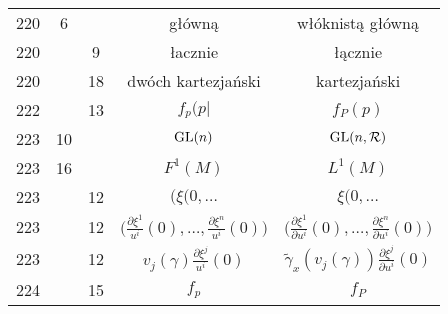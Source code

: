 \documentclass[a4paper,11pt]{article}
\begin{document}
\begin{center}
\begin{tabular}{|c|c|c|c|c|}
    220 & \hphantom{0}6 & & główną & włóknistą główną \\
    220 & & \hphantom{0}9 & łacznie & łącznie \\
    220 & & 18 & dwóch kartezjański & kartezjański \\
    222 & & 13 & $f_{ p }( p |$ & $f_{ P }( p )$ \\
    223 & 10 & & $\mathrm{GL}( n )$ & $\mathrm{GL}( n, \mathcal{R} )$ \\
    223 & 16 & & $F^{ 1 }( M )$ & $L^{ 1 }( M )$ \\
    223 & & 12 & $( \xi( 0, \ldots$ & $\xi( 0, \ldots$ \\[0.4em]
    223 & & 12 & $\big( \frac{ \partial \xi^{ 1 } }{ u^{ i } }( 0 ), \ldots,
                 \frac{ \partial \xi^{ n } }{ u^{ i } }( 0 ) \big)$
           & $\big( \frac{ \partial \xi^{ 1 } }{ \partial u^{ i } }( 0 ), \ldots,
             \frac{ \partial \xi^{ n } }{ \partial u^{ i } }( 0 ) \big)$ \\
    223 & & 12 & $v_{ j }( \gamma ) \frac{ \partial \xi ^{ j } }{ u^{ i } }( 0 )$
           & $\widetilde{ \gamma }_{ x }( v_{ j }( \gamma ) )
             \frac{ \partial \xi ^{ j } }{ \partial u^{ i } }( 0 )$ \\
    224 & & 15 & $f_{ p }$ & $f_{ P }$ \\
    \hline
  \end{tabular}





  \newpage


\end{center}
\end{document}
